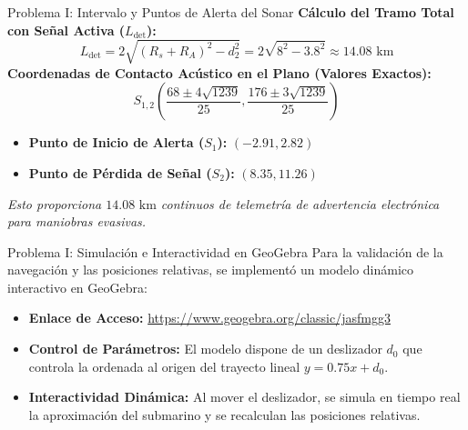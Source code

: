 \documentclass[aspectratio=169]{beamer}
\begin{document}
\begin{frame}{Problema I: Intervalo y Puntos de Alerta del Sonar}
  \textbf{Cálculo del Tramo Total con Señal Activa ($L_{\text{det}}$):}
  \[L_{\text{det}} = 2\sqrt{(R_s + R_A)^2 - d_2^2} = 2\sqrt{8^2 - 3.8^2} \approx 14.08\text{~km}\]
  \vspace{0.2cm}
  \textbf{Coordenadas de Contacto Acústico en el Plano (Valores Exactos):}
  \[S_{1,2} \left( \frac{68 \pm 4\sqrt{1239}}{25}, \frac{176 \pm 3\sqrt{1239}}{25} \right)\]
  \vspace{0.15cm}
  \begin{itemize}
    \item \textbf{Punto de Inicio de Alerta ($S_1$):} $(-2.91, 2.82)$
    \item \textbf{Punto de Pérdida de Señal ($S_2$):} $(8.35, 11.26)$
  \end{itemize}
  \vspace{0.1cm}
  {\centering \scriptsize \textit{Esto proporciona $14.08\text{~km}$ continuos de telemetría de advertencia electrónica para maniobras evasivas.} \par}
\end{frame}

\begin{frame}{Problema I: Simulación e Interactividad en GeoGebra}
  Para la validación de la navegación y las posiciones relativas, se implementó un modelo dinámico interactivo en GeoGebra:
  \vspace{0.3cm}
  \begin{itemize}
    \item \textbf{Enlace de Acceso:} \url{https://www.geogebra.org/classic/jasfmgg3}
    \vspace{0.2cm}
    \item \textbf{Control de Parámetros:} El modelo dispone de un deslizador $d_0$ que controla la ordenada al origen del trayecto lineal $y = 0.75x + d_0$.
    \vspace{0.2cm}
    \item \textbf{Interactividad Dinámica:} Al mover el deslizador, se simula en tiempo real la aproximación del submarino y se recalculan las posiciones relativas.
  \end{itemize}
\end{frame}
\end{document}
